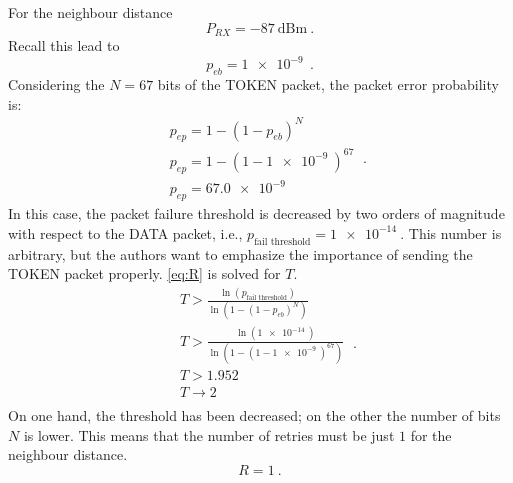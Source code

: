For the neighbour distance
\begin{equation}
		P_{RX} = - \SI{87}{\dB}\text{m} \ .
\end{equation}
Recall this lead to
\begin{equation}
	p_{eb} = \SI{1e-9}{} \ .
\end{equation}
Considering the $N = 67$ bits of the TOKEN packet, the packet error probability is:
\begin{equation}
	\begin{split}
		& p_{ep} = 1 - \left( 1 - p_{eb} \right)^N \\
		& p_{ep} = 1 - \left( 1 - \SI{1e-9}{} \right)^{67} \\
		& p_{ep} = \SI{67.0e-9}{}
	\end{split} \ .
\end{equation}
In this case, the packet failure threshold is decreased by two orders of magnitude with respect to the DATA packet, i.e., $p_{\text{fail threshold}} = \SI{1e-14}{}$. This number is arbitrary, but the authors want to emphasize the importance of sending the TOKEN packet properly. \eqref{eq:R} is solved for $T$.
\begin{equation}
	\begin{split}
		& T > \frac{\ln \left( p_{\text{fail threshold}}  \right) }{\ln \left( 1 - \left( 1 - p_{eb} \right)^N \right) } \\
		& T > \frac{\ln \left( \SI{1e-14}{} \right) }{\ln \left( 1 - \left( 1 - \SI{1e-9}{} \right)^{67} \right) } \\
		& T > 1.952 \\
		& T \rightarrow 2 \\
	\end{split} \ .
\end{equation}
On one hand, the threshold has been decreased; on the other the number of bits $N$ is lower. This means that the number of retries must be just $1$ for the neighbour distance.
\begin{equation}
	R = 1 \ .
\end{equation}



